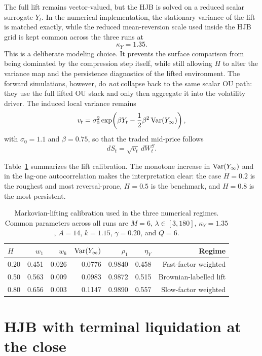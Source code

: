 The full lift remains vector-valued, but the HJB is solved on a reduced scalar surrogate \(Y_t\). In the numerical implementation, the stationary variance of the lift is matched exactly, while the reduced mean-reversion scale used inside the HJB grid is kept common across the three runs at
\[
\kappa_Y=1.35.
\]
This is a deliberate modeling choice. It prevents the surface comparison from being dominated by the compression step itself, while still allowing \(H\) to alter the variance map and the persistence diagnostics of the lifted environment. The forward simulations, however, do \emph{not} collapse back to the same scalar OU path: they use the full lifted OU stack and only then aggregate it into the volatility driver. The induced local variance remains
\[
v_t
=
\sigma_0^2
\exp\!\left(
\beta Y_t
-\frac12\beta^2\operatorname{Var}(Y_\infty)
\right),
\]
with \(\sigma_0=1.1\) and \(\beta=0.75\), so that the traded mid-price follows
\[
dS_t=\sqrt{v_t}\,dW_t^S.
\]

Table~\ref{hft2-tab:hjb_calibration} summarizes the lift calibration. The monotone increase in \(\operatorname{Var}(Y_\infty)\) and in the lag-one autocorrelation makes the interpretation clear: the case \(H=0.2\) is the roughest and most reversal-prone, \(H=0.5\) is the benchmark, and \(H=0.8\) is the most persistent.

\begin{table}[H]
\centering
\caption{Markovian-lifting calibration used in the three numerical regimes. Common parameters across all runs are \(M=6\), \(\lambda \in [3,180]\), \(\kappa_Y=1.35\), \(A=14\), \(k=1.15\), \(\gamma=0.20\), and \(Q=6\).}
\label{hft2-tab:hjb_calibration}
\begin{tabular}{@{}lrrrrrr@{}}
\toprule
\(H\) & \(w_1\) & \(w_6\) & \(\operatorname{Var}(Y_\infty)\) & \(\rho_1\) & \(\eta_Y\) & Regime \\
\midrule
0.20 & 0.451 & 0.026 & 0.0776 & 0.9840 & 0.458 & Fast-factor weighted \\
0.50 & 0.563 & 0.009 & 0.0983 & 0.9872 & 0.515 & Brownian-labelled lift \\
0.80 & 0.656 & 0.003 & 0.1147 & 0.9890 & 0.557 & Slow-factor weighted \\
\bottomrule
\end{tabular}
\end{table}

\section{HJB with terminal liquidation at the close}

